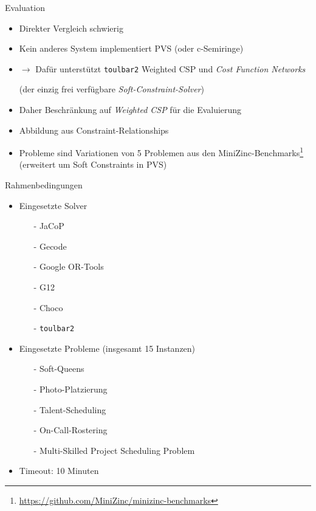 
\begin{frame}{Evaluation}
\begin{itemize}
\item Direkter Vergleich schwierig
\item Kein anderes System implementiert PVS (oder c-Semiringe)
\item $\rightarrow$ Dafür unterstützt \texttt{toulbar2} Weighted CSP und \emph{Cost Function Networks}
\item[] (der einzig frei verfügbare \emph{Soft-Constraint-Solver})
\end{itemize}

\vspace*{2ex} \pause 

\begin{itemize}
\item Daher Beschränkung auf \emph{Weighted CSP} für die Evaluierung
\item Abbildung aus Constraint-Relationships
\item Probleme sind Variationen von 5 Problemen aus den MiniZinc-Benchmarks\footnote{\url{https://github.com/MiniZinc/minizinc-benchmarks}} (erweitert um Soft Constraints in PVS)
\end{itemize}


\end{frame}

\begin{frame}{Rahmenbedingungen}
\begin{itemize}
\item Eingesetzte Solver
\begin{itemize}
\item[-] JaCoP
\item[-] Gecode
\item[-] Google OR-Tools
\item[-] G12
\item[-] Choco
\item[-] \texttt{toulbar2}
\end{itemize}

\vspace*{2ex}

\item Eingesetzte Probleme (insgesamt 15 Instanzen)
\begin{itemize}
\item[-] Soft-Queens
\item[-] Photo-Platzierung
\item[-] Talent-Scheduling
\item[-] On-Call-Rostering
\item[-] Multi-Skilled Project Scheduling Problem
\end{itemize}

\vspace*{2ex}
\item Timeout: 10 Minuten
\end{itemize}
\end{frame}

